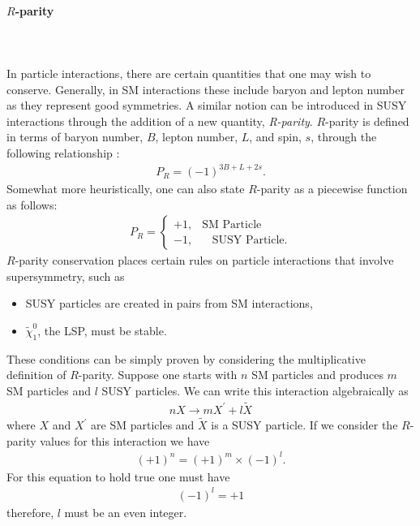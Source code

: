 \paragraph{$R$-parity}  
\
\\ \\
In particle interactions, there are certain quantities that one may wish to conserve.
Generally, in SM interactions these include baryon and lepton number as they represent good symmetries.
A similar notion can be introduced in SUSY interactions through the addition of a new quantity, \textit{R-parity}.
$R$-parity is defined in terms of baryon number, $B$, lepton number, $L$, and spin, $s$, through the following relationship \cite{martin2010supersymmetry}:
\begin{align}
P_{R} = (-1)^{3B + L + 2s}.
\end{align}
Somewhat more heuristically, one can also state $R$-parity as a piecewise function as follows:
\begin{align}
P_{R} = \left\{\begin{matrix}
+1, & \textrm{SM Particle} \\ 
-1,  & \ \ \ \ \textrm{SUSY Particle}.  
\end{matrix}\right.
\end{align}
$R$-parity conservation places certain rules on particle interactions that involve supersymmetry, such as
\begin{itemize}
\item SUSY particles are created in pairs from SM interactions,
\item $\tilde{\chi}^{0}_{1}$, the LSP,  must be stable.
\end{itemize}
These conditions can be simply proven by considering the multiplicative definition of $R$-parity.
Suppose one starts with $n$ SM particles and produces $m$ SM particles and $l$ SUSY particles.
We can write this interaction algebraically as
\begin{align}
n X \rightarrow m X^{\prime} + l \tilde{X}
\end{align}
where $X$ and $X^{\prime}$ are SM particles and $\tilde{X}$ is a SUSY particle.
If we consider the $R$-parity values for this interaction we have
\begin{align}
(+1)^{n} = (+1)^{m} \times (-1)^{l}.
\end{align}
For this equation to hold true one must have
\begin{align}
(-1)^{l} = +1
\end{align}
therefore, $l$ must be an even integer.

